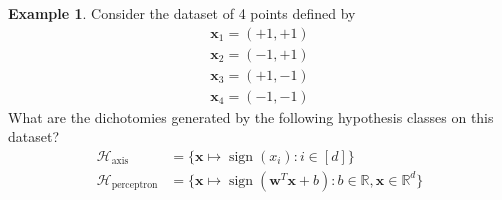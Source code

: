 \documentclass[10pt]{exam}
\theoremstyle{definition}
\newtheorem{problem}{Problem}
\newtheorem{example}{Example}
\newcommand{\R}{\mathbb R}
\DeclareMathOperator{\sign}{sign}
\newcommand{\trans}[1]{{#1}^{T}}
\newcommand{\w}{\mathbf w}
\newcommand{\x}{\mathbf x}
\newcommand{\HH}[1]{\mathcal H_{\text{#1}}}
\begin{document}
\begin{example}
    Consider the dataset of 4 points defined by
    \begin{align*}
    \x_1 = (+1,+1) \\
    \x_2 = (-1,+1) \\
    \x_3 = (+1,-1) \\
    \x_4 = (-1,-1)
    \end{align*}
    What are the dichotomies generated by the following hypothesis classes on this dataset?
    \begin{align*}
    \HH{axis} &= \bigg\{ \x \mapsto \sign(x_i) : i \in [d] \bigg\} \\
        \HH{perceptron} &= \bigg\{ \x \mapsto \sign(\trans\w\x + b) : b \in \R, \x \in \R^d \bigg\}
    \end{align*}
\end{example}


\end{document}
